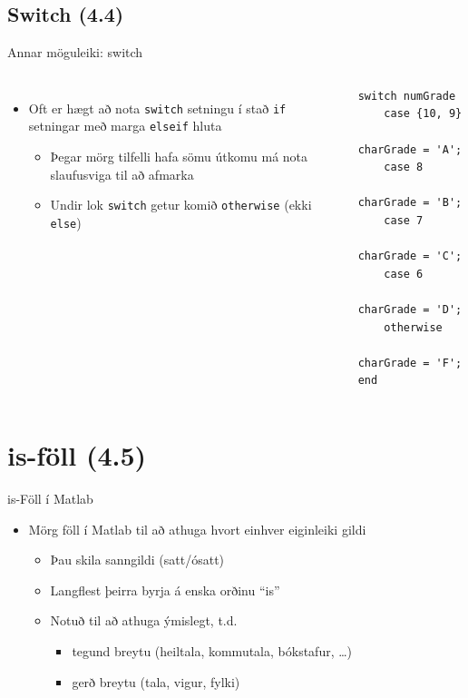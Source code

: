 \documentclass{beamer}
\begin{document}
\subsection{Switch (4.4)}
\begin{frame}[fragile]{Annar möguleiki: switch}
\begin{columns}
\begin{itemize}
 \item Oft er hægt að nota \texttt{switch} setningu í stað \texttt{if} setningar með marga \texttt{elseif} hluta
 \begin{itemize}
  \item Þegar mörg tilfelli hafa sömu útkomu má nota slaufusviga til að afmarka
  \item Undir lok \texttt{switch} getur komið \texttt{otherwise} (ekki \texttt{else})
 \end{itemize}

\end{itemize}

\vspace{\baselineskip}
\begin{verbatim}
switch numGrade
    case {10, 9}
        charGrade = 'A';
    case 8
        charGrade = 'B';
    case 7
        charGrade = 'C';
    case 6
        charGrade = 'D';
    otherwise
        charGrade = 'F';
end
\end{verbatim}
\end{columns}
\end{frame}

\section{is-föll (4.5)}

\begin{frame}{is-Föll í Matlab}
\begin{itemize}
 \item Mörg föll í Matlab til að athuga hvort einhver eiginleiki gildi
 \begin{itemize}
  \item Þau skila sanngildi (satt/ósatt)
  \item Langflest þeirra byrja á enska orðinu ``is''
  \item Notuð til að athuga ýmislegt, t.d.
  \begin{itemize}
   \item tegund breytu (heiltala, kommutala, bókstafur, \ldots)
   \item gerð breytu (tala, vigur, fylki)
  \end{itemize}
 \end{itemize}
\end{itemize}
\end{frame}
\end{document}
